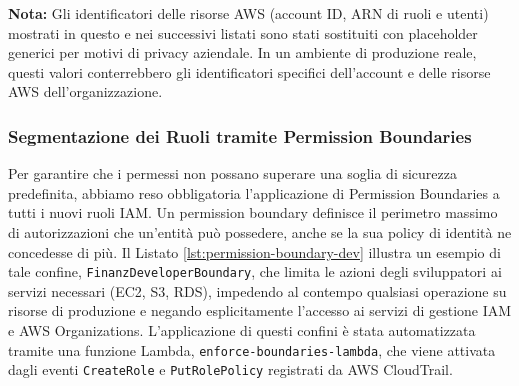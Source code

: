 \textbf{Nota:} Gli identificatori delle risorse AWS (account ID, ARN di ruoli e utenti) mostrati in questo e nei successivi listati sono stati sostituiti con placeholder generici per motivi di privacy aziendale. In un ambiente di produzione reale, questi valori conterrebbero gli identificatori specifici dell'account e delle risorse AWS dell'organizzazione.

\subsubsection{Segmentazione dei Ruoli tramite Permission Boundaries}
Per garantire che i permessi non possano superare una soglia di sicurezza predefinita, abbiamo reso obbligatoria l'applicazione di Permission Boundaries a tutti i nuovi ruoli IAM. Un permission boundary definisce il perimetro massimo di autorizzazioni che un'entità può possedere, anche se la sua policy di identità ne concedesse di più. Il Listato \ref{lst:permission-boundary-dev} illustra un esempio di tale confine, \texttt{FinanzDeveloperBoundary}, che limita le azioni degli sviluppatori ai servizi necessari (EC2, S3, RDS), impedendo al contempo qualsiasi operazione su risorse di produzione e negando esplicitamente l'accesso ai servizi di gestione IAM e AWS Organizations. L'applicazione di questi confini è stata automatizzata tramite una funzione Lambda, \texttt{enforce-boundaries-lambda}, che viene attivata dagli eventi \texttt{CreateRole} e \texttt{PutRolePolicy} registrati da AWS CloudTrail.
